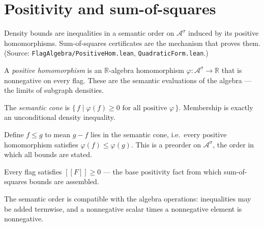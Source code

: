 \chapter{Positivity and sum-of-squares}
\label{chap:positivity}

Density bounds are inequalities in a semantic order on $\mathcal{A}^\sigma$
induced by its positive homomorphisms. Sum-of-squares certificates are the
mechanism that proves them. (Source: \texttt{FlagAlgebra/PositiveHom.lean},
\texttt{QuadraticForm.lean}.)

\begin{definition}
  \label{def:positive-hom}
  \leanok
  A \emph{positive homomorphism} is an $\mathbb{R}$-algebra homomorphism
  $\varphi : \mathcal{A}^\sigma \to \mathbb{R}$ that is nonnegative on every flag.
  These are the semantic evaluations of the algebra --- the limits of subgraph
  densities.
\end{definition}

\begin{definition}
  \label{def:semantic-cone}
  \leanok
  The \emph{semantic cone} is $\{\, f \mid \varphi(f) \ge 0 \text{ for all
  positive } \varphi \,\}$. Membership is exactly an unconditional density
  inequality.
\end{definition}

\begin{definition}
  \label{def:semantic-order}
  \leanok
  Define $f \le g$ to mean $g - f$ lies in the semantic cone, i.e.\ every
  positive homomorphism satisfies $\varphi(f) \le \varphi(g)$. This is a preorder
  on $\mathcal{A}^\sigma$, the order in which all bounds are stated.
\end{definition}

\begin{theorem}
  \label{thm:flag-nonneg}
  \leanok
  Every flag satisfies $[\![F]\!] \ge 0$ --- the base positivity fact from which
  sum-of-squares bounds are assembled.
\end{theorem}

\begin{lemma}
  \label{lem:order-monotone}
  \leanok
  The semantic order is compatible with the algebra operations: inequalities may
  be added termwise, and a nonnegative scalar times a nonnegative element is
  nonnegative.
\end{lemma}

